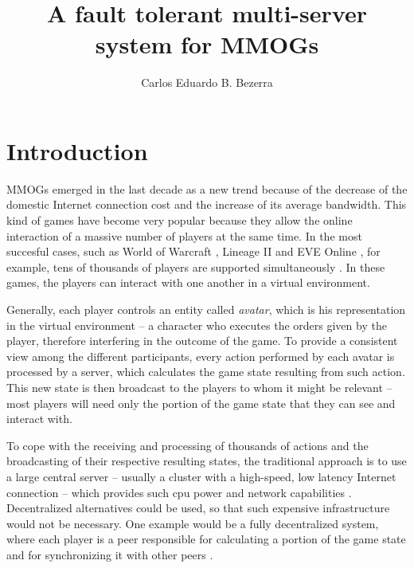 \documentclass[]{usiinfprospectus}
\author{Carlos Eduardo B. Bezerra}
\title{A fault tolerant multi-server system for MMOGs}
\begin{document}
\maketitle

\section{Introduction} \label{sec:introduction}

MMOGs emerged in the last decade as a new trend because of the decrease of the domestic Internet connection cost and the increase of its average bandwidth. This kind of games have become very popular because they allow the online interaction of a massive number of players at the same time. In the most succesful cases, such as World of Warcraft \cite{worldofwarcraft}, Lineage II \cite{lineage2} and EVE Online \cite{eveonline}, for example, tens of thousands of players are supported simultaneously \cite{chen2006pch}. In these games, the players can interact with one another in a virtual environment.

Generally, each player controls an entity called \emph{avatar}, which is his representation in the virtual environment -- a character who executes the orders given by the player, therefore interfering in the outcome of the game. To provide a consistent view among the different participants, every action performed by each avatar is processed by a server, which calculates the game state resulting from such action. This new state is then broadcast to the players to whom it might be relevant -- most players will need only the portion of the game state that they can see and interact with.

To cope with the receiving and processing of thousands of actions and the broadcasting of their respective resulting states, the traditional approach is to use a large central server -- usually a cluster with a high-speed, low latency Internet connection -- which provides such cpu power and network capabilities \cite{feng2007wnn}. Decentralized alternatives could be used, so that such expensive infrastructure would not be necessary. One example would be a fully decentralized system, where each player is a peer responsible for calculating a portion of the game state and for synchronizing it with other peers \cite{rieche2007ppb, hampel2006ppa, elrhalibi2005abm, iimura2004zfg, knutsson2004pps}.
\end{document}
